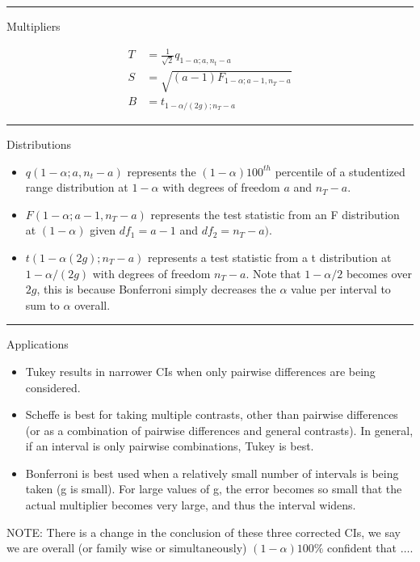 \documentclass[10pt]{article}
\newcommand{\define}[1]{\colorbox{Thistle2}{#1}}
\newcommand{\drawline}{\noindent\rule{\linewidth}{0.1pt}}
\begin{document}
\begin{multicols}{3}
    \drawline

    Multipliers

    \begin{align}
        T & = \frac{1}{\sqrt{2}} q_{1-\alpha; a, n_t - a} \\
        S & = \sqrt{(a-1) F_{1-\alpha; a - 1, n_T - a}} \\
        B & = t_{1 - \alpha/(2g); n_T - a} 
    \end{align}

    \drawline
    
    Distributions
    \begin{itemize}
        \item $q(1-\alpha; a, n_t - a)$ represents the $(1-\alpha)100^{th}$ percentile of a studentized range distribution at $1-\alpha$ with degrees of freedom $a$ and $n_T - a$.
        \item $F(1-\alpha; a-1, n_T - a)$ represents the test statistic from an F distribution at $(1-\alpha)$ given $df_1 = a-1$ and $df_2 = n_T - a)$.
        \item $t(1-\alpha(2g); n_T - a)$ represents a test statistic from a t distribution at $1-\alpha/(2g)$ with degrees of freedom $n_T - a$. Note that $1-\alpha/2$ becomes over $2g$, this is because Bonferroni simply decreases the $\alpha$ value per interval to sum to $\alpha$ overall.
    \end{itemize}

    \drawline

    Applications
    \begin{itemize}
        \item Tukey results in narrower CIs when only pairwise differences are being considered.
        \item Scheffe is best for taking multiple contrasts, other than pairwise differences (or as a combination of pairwise differences and general contrasts). In general, if an interval is only pairwise combinations, Tukey is best.
        \item Bonferroni is best used when a relatively small number of intervals is being taken (g is small). For large values of g, the error becomes so small that the actual multiplier becomes very large, and thus the interval widens.
    \end{itemize}

    NOTE: There is a change in the conclusion of these three corrected CIs, we say we are \define{overall} (or family wise or simultaneously) $(1-\alpha)100\%$ confident that $\dots$.

\end{multicols}
\end{document}
